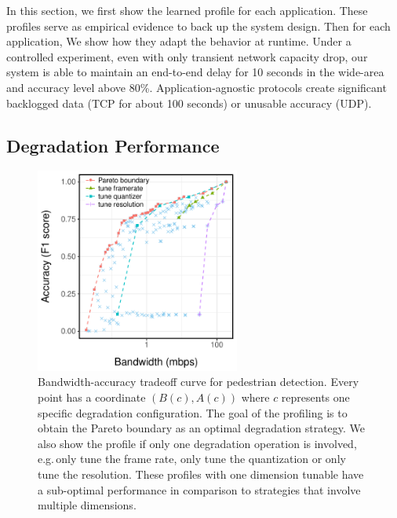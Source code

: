 In this section, we first show the learned profile for each application. These
profiles serve as empirical evidence to back up the system design. Then for each
application, We show how they adapt the behavior at runtime. Under a controlled
experiment, even with only transient network capacity drop, our system is able
to maintain an end-to-end delay for 10 seconds in the wide-area and accuracy
level above 80\%. Application-agnostic protocols create significant backlogged
data (TCP for about 100 seconds) or unusable accuracy (UDP).

\subsection{Degradation Performance}
\label{sec:degr-perf}

\begin{figure}
  \centering
  \includegraphics[width=0.6\textwidth]{figures/ped-profile.pdf}
  \caption{Bandwidth-accuracy tradeoff curve for pedestrian detection. Every
    point has a coordinate $(B(c), A(c))$ where $c$ represents one specific
    degradation configuration. The goal of the profiling is to obtain the Pareto
    boundary as an optimal degradation strategy. We also show the profile if
    only one degradation operation is involved, e.g.\,only tune the frame rate,
    only tune the quantization or only tune the resolution. These profiles with
    one dimension tunable have a sub-optimal performance in comparison to
    strategies that involve multiple dimensions.}
  \label{fig:pd-profile}
\end{figure}

